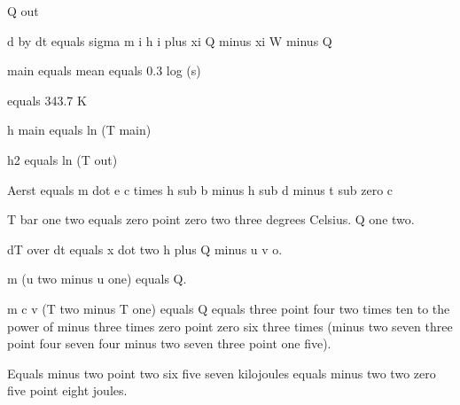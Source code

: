 Q out

d by dt equals sigma m i h i plus xi Q minus xi W minus Q

main equals mean equals 0.3 log (s)

equals 343.7 K

h main equals ln (T main)

h2 equals ln (T out)

Aerst equals m dot e c times h sub b minus h sub d minus t sub zero c

T bar one two equals zero point zero two three degrees Celsius. Q one two.

dT over dt equals x dot two h plus Q minus u v o.

m (u two minus u one) equals Q.

m c v (T two minus T one) equals Q equals three point four two times ten to the power of minus three times zero point zero six three times (minus two seven three point four seven four minus two seven three point one five).

Equals minus two point two six five seven kilojoules equals minus two two zero five point eight joules.